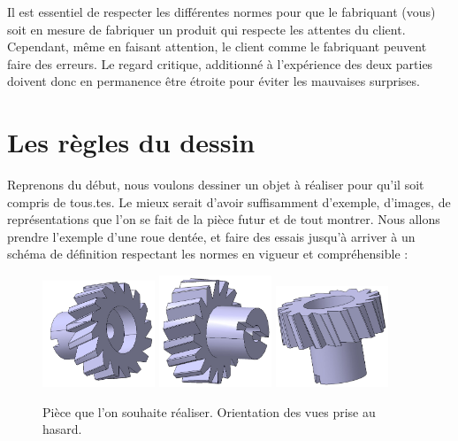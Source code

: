 \documentclass[
	11pt, %
	fleqn, %
	a4paper, %
]{LegrandOrangeBook}
\begin{document}
Il est essentiel de respecter les différentes normes pour que le fabriquant (vous) soit en mesure de fabriquer un produit qui respecte les attentes du client. Cependant, même en faisant attention, le client comme le fabriquant peuvent faire des erreurs. Le regard critique, additionné à l'expérience des deux parties doivent donc en permanence être étroite pour éviter les mauvaises surprises. 

\section{Les règles du dessin}


Reprenons du début, nous voulons dessiner un objet à réaliser pour qu'il soit compris de tous.tes. Le mieux serait d'avoir suffisamment d'exemple, d'images, de représentations que l'on se fait de la pièce futur et de tout montrer. Nous allons prendre l'exemple d'une roue dentée, et faire des essais jusqu'à arriver à un schéma de définition respectant les normes en vigueur et compréhensible :
\begin{figure}[H] %
	\centering %
	\includegraphics[width=0.3\textwidth]{Images/R1.JPG} %
    \includegraphics[width=0.3\textwidth]{Images/R2.JPG} %
    \includegraphics[width=0.3\textwidth]{Images/R3.JPG} %
	\caption{Pièce que l'on souhaite réaliser. Orientation des vues prise au hasard.}
	\label{Roue1} %
\end{figure}
\end{document}

